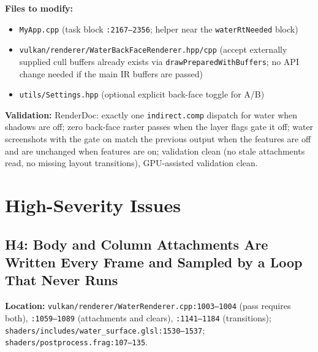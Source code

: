 \documentclass[11pt,a4paper]{article}
\begin{document}
\begin{tcolorbox}[promptbox={Prompt: Make the Back-Face Pass Demand-Driven and Reuse the Main Cull}]
\textbf{Files to modify:}
\begin{itemize}
    \item \texttt{MyApp.cpp} (task block \texttt{:2167--2356}; helper near the \texttt{waterRtNeeded} block)
    \item \texttt{vulkan/renderer/WaterBackFaceRenderer.hpp/cpp} (accept externally supplied cull buffers already exists via \texttt{drawPreparedWithBuffers}; no API change
    needed if the main IR buffers are passed)
    \item \texttt{utils/Settings.hpp} (optional explicit back-face toggle for A/B)
\end{itemize}

\textbf{Validation:} RenderDoc: exactly one \texttt{indirect.comp} dispatch for water when shadows are off; zero back-face raster passes when the layer flags gate it off;
water screenshots with the gate on match the previous output when the features are off and are unchanged when features are on; validation clean (no stale attachments read,
no missing layout transitions), GPU-assisted validation clean.
\end{tcolorbox}

\section{High-Severity Issues}

\subsection{H4: Body and Column Attachments Are Written Every Frame and Sampled by a Loop That Never Runs}

\textbf{Location:} \texttt{vulkan/renderer/WaterRenderer.cpp:1003--1004} (pass requires both), \texttt{:1059--1089} (attachments and clears),
\texttt{:1141--1184} (transitions); \texttt{shaders/includes/water\_surface.glsl:1530--1537}; \texttt{shaders/postprocess.frag:107--135}.
\end{document}
